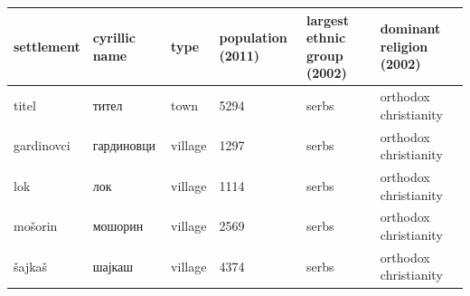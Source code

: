 \documentclass{article}
\begin{document}
\begin{tabular}{llllll}
\toprule
settlement & cyrillic name & type & population (2011) & largest ethnic group (2002) & dominant religion (2002) \\
\midrule
titel & тител & town & 5294 & serbs & orthodox christianity \\
gardinovci & гардиновци & village & 1297 & serbs & orthodox christianity \\
lok & лок & village & 1114 & serbs & orthodox christianity \\
mošorin & мошорин & village & 2569 & serbs & orthodox christianity \\
šajkaš & шајкаш & village & 4374 & serbs & orthodox christianity \\
\bottomrule
\end{tabular}
\end{document}
